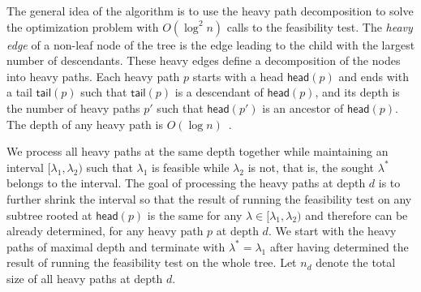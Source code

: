 \documentclass[a4paper,UKenglish]{lipics-v2016}
\theoremstyle{plain}
\newcommand{\head}{\textsf{head}}
\newcommand{\tail}{\textsf{tail}}
\begin{document}
The general idea of the algorithm is to use the heavy path decomposition to solve the optimization  problem
with $O(\log^{2}n)$ calls to the feasibility test. The {\em heavy edge} of a non-leaf node of the tree is the edge leading to the child
with the largest number of descendants. These heavy edges define a decomposition of the nodes into heavy paths. Each heavy
path $p$ starts with a head $\head(p)$ and ends with a tail $\tail(p)$ such that $\tail(p)$ is a descendant of $\head(p)$,
and its depth is the number of heavy paths $p'$ such that $\head(p')$ is an ancestor of $\head(p)$. The depth of any heavy path is 
$O(\log n)$~\cite{Sleator1983}.

We process all heavy paths at the same depth together while maintaining an interval $[\lambda_{1},\lambda_{2})$ such that
$\lambda_{1}$ is feasible while $\lambda_{2}$ is not, that is, the sought $\lambda^{*}$ belongs to the interval.
The goal of processing the heavy paths at depth $d$ is to further shrink the interval so that the result of running the feasibility
test on any subtree rooted at $\head(p)$ is the same for any $\lambda\in[\lambda_{1},\lambda_{2})$ and therefore can
be already determined, for any heavy path $p$ at depth $d$. We start with the heavy paths of maximal depth and terminate
with $\lambda^{*}=\lambda_{1}$ after having determined the result of running the feasibility test on the whole tree.
Let $n_{d}$ denote the total size of all heavy paths at depth $d$.
\end{document}
